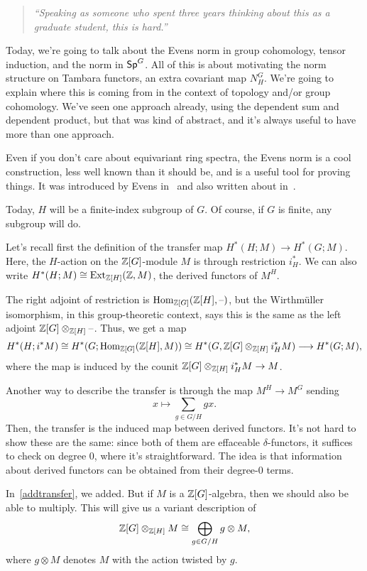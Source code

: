 \begin{quote}\textit{
	``Speaking as someone who spent three years thinking about this as a graduate student, this is hard.''
}\end{quote}
\label{evenssec}
Today, we're going to talk about the Evens norm in group cohomology, tensor induction, and the norm in $\mathsf{Sp}^G$.
All of this is about motivating the norm structure on Tambara functors, an extra covariant map $N_H^G$. We're going
to explain where this is coming from in the context of topology and/or group cohomology. We've seen one approach
already, using the dependent sum and dependent product, but that was kind of abstract, and it's always useful to
have more than one approach.

Even if you don't care about equivariant ring spectra, the Evens norm is a cool construction, less well known than
it should be, and is a useful tool for proving things. It was introduced by Evens in~ and also written
about in~.

Today, $H$ will be a finite-index subgroup of $G$. Of course, if $G$ is finite, any subgroup will do.

Let's recall first the definition of the transfer map $H^*(H;M)\to H^*(G;M)$. Here, the $H$-action on the
$\mathbb Z[G]$-module $M$ is through restriction $i_H^*$. We can also write $H^*(H;M)\cong\operatorname{Ext}_{\mathbb Z[H]}(\mathbb Z, M)$, the
derived functors of $M^H$.

The right adjoint of restriction is $\operatorname{Hom}_{\mathbb Z[G]}(\mathbb Z[H], \text{--})$, but the Wirthmüller isomorphism, in this
group-theoretic context, says this is the same as the left adjoint $\mathbb Z[G]\otimes_{\mathbb Z[H]}\text{--}$. Thus, we get a map
\[H^*(H; i^*M)\cong H^*(G; \operatorname{Hom}_{\mathbb Z[G]}(\mathbb Z[H], M))\cong H^*(G, \mathbb Z[G]\otimes_{\mathbb Z[H]} i_H^*M)\longrightarrow
H^*(G;M),\]
where the map is induced by the counit $\mathbb Z[G]\otimes_{\mathbb Z[H]} i_H^*M\to M$.

Another way to describe the transfer is through the map $M^H\to M^G$ sending
\begin{equation}
\label{addtransfer}
x\mapsto \sum_{g\in G/H} gx.
\end{equation}
Then, the transfer is the induced map between derived functors. It's not hard to show these are the same: since
both of them are effaceable $\delta$-functors, it suffices to check on degree $0$, where it's straightforward. The
idea is that information about derived functors can be obtained from their degree-$0$ terms.

In~\eqref{addtransfer}, we added. But if $M$ is a $\mathbb Z[G]$-algebra, then we should also be able to multiply. This
will give us a variant description of
\[\mathbb Z[G]\otimes_{\mathbb Z[H]} M\cong \bigoplus_{g\in G/H} g\otimes M,\]
where $g\otimes M$ denotes $M$ with the action twisted by $g$.

